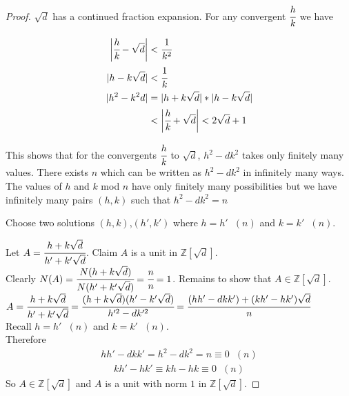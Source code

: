 \documentclass[11pt]{article}
\begin{document}
\begin{proof}
	$\sqrt{d}$ has a continued fraction expansion. For any convergent $\cfrac{h}{k}$ we have

	\begin{align*}
		\bigg | \cfrac{h}{k} -\sqrt{d} \bigg | &< \cfrac{1}{k^2} \\
		| h-k\sqrt{d}  | &< \cfrac{1}{k}\\
		 | h^2 -k^2d | &=|h+k\sqrt{d} | * |h-k\sqrt{d}|\\
		 &< \bigg| \cfrac{h}{k} + \sqrt{d} \bigg | < 2\sqrt{d}+1 
	\end{align*}

	This shows that for the convergents $\cfrac{h}{k} $ to $\sqrt{d}$, $h^2-dk^2$ takes only finitely many values. There exists $n$ which can be written as $h^2 - dk^2$ in infinitely many ways. The values of $h$ and $k$ mod $n$ have only finitely many possibilities but we have infinitely many pairs $(h,k)$ such that $h^2-dk^2=n$


	Choose two solutions $(h,k)$,$(h',k')$ where $h=h' \hspace{7pt} (n) $ and $k=k'\hspace{7pt} (n) $.

	$ $\\
	Let $A= \cfrac{h+k\sqrt{d}}{h'+k'\sqrt{d}}$. Claim $A$ is a unit in $\mathbb{Z}[\sqrt{d}].$ $ $\\[1em]
	Clearly $N(A) = \cfrac{N(h+k\sqrt{d})}{N(h'+k'\sqrt{d})} = \cfrac{n}{n} = 1$.
	Remains to show that $A \in \mathbb{Z}[\sqrt{d}]$.
	$ $\\[1em]
	$A= \cfrac{h+k\sqrt{d}}{h'+k'\sqrt{d}}  = \cfrac{(h+k\sqrt{d})(h'-k'\sqrt{d})}{h'^2 -dk'^2 } = \cfrac{(hh'-dkk')+(kh'-hk')\sqrt{d}}{n}$\\[2em]
	Recall $h=h'\hspace{7pt} (n) $ and $k=k'\hspace{7pt} (n) $. 
	$ $\\[1em]
	Therefore
	\begin{align*}
	hh'-dkk' = h^2-dk^2=n \equiv 0\hspace{7pt} (n)
	\end{align*}
	\vspace{-2em}
	\begin{align*}
		kh'-hk' \equiv kh -hk \equiv 0 \hspace{7pt} (n) 
	\end{align*}
	So $A \in \mathbb{Z}[\sqrt{d}]$ and $A$ is a unit with norm $1$ in $\mathbb{Z}[\sqrt{d}]$.
\end{proof}
\end{document}
